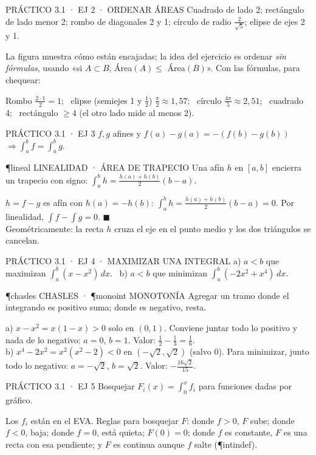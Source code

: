 \begin{enunciado}{PRÁCTICO 3.1 · EJ 2 · ORDENAR ÁREAS}
Cuadrado de lado 2; rectángulo de lado menor 2; rombo de diagonales 2 y 1; círculo de radio $\frac2{\sqrt5}$; elipse de ejes 2 y 1.
\end{enunciado}
\begin{falta}
La figura muestra cómo están encajadas; la idea del ejercicio es ordenar \emph{sin fórmulas}, usando «si $A\subset B$, Área$(A)\le$ Área$(B)$». Con las fórmulas, para chequear:
\end{falta}
Rombo $\frac{2\cdot1}2=1$; \ elipse (semiejes 1 y $\frac12$) $\frac\pi2\approx1{,}57$; \ círculo $\frac{4\pi}5\approx2{,}51$; \ cuadrado 4; \ rectángulo $\ge4$ (el otro lado mide al menos 2).

\begin{enunciado}{PRÁCTICO 3.1 · EJ 3}
$f,g$ afines y $f(a)-g(a)=-(f(b)-g(b))$ $\Rightarrow\int_a^bf=\int_a^bg$.
\end{enunciado}
\begin{uso}{\P{lineal} LINEALIDAD · ÁREA DE TRAPECIO}
Una afín $h$ en $[a,b]$ encierra un trapecio con signo: $\int_a^bh=\frac{h(a)+h(b)}2(b-a)$.
\end{uso}
$h=f-g$ es afín con $h(a)=-h(b)$: $\int_a^bh=\frac{h(a)+h(b)}2(b-a)=0$. Por linealidad, $\int f-\int g=0$. $\blacksquare$\\
Geométricamente: la recta $h$ cruza el eje en el punto medio y los dos triángulos se cancelan.

\begin{enunciado}{PRÁCTICO 3.1 · EJ 4 · MAXIMIZAR UNA INTEGRAL}
a) $a<b$ que maximizan $\int_a^b(x-x^2)\,dx$. \ b) $a<b$ que minimizan $\int_a^b(-2x^2+x^4)\,dx$.
\end{enunciado}
\begin{uso}{\P{chasles} CHASLES · \P{monoint} MONOTONÍA}
Agregar un tramo donde el integrando es positivo suma; donde es negativo, resta.
\end{uso}
a) $x-x^2=x(1-x)>0$ solo en $(0,1)$. Conviene juntar todo lo positivo y nada de lo negativo: $a=0$, $b=1$. Valor: $\frac12-\frac13=\frac16$.\\
b) $x^4-2x^2=x^2(x^2-2)<0$ en $(-\sqrt2,\sqrt2)$ (salvo 0). Para minimizar, junto todo lo negativo: $a=-\sqrt2$, $b=\sqrt2$. Valor: $-\frac{16\sqrt2}{15}$.

\begin{enunciado}{PRÁCTICO 3.1 · EJ 5}
Bosquejar $F_i(x)=\int_0^xf_i$ para funciones dadas por gráfico.
\end{enunciado}
\begin{falta}
Los $f_i$ están en el EVA. Reglas para bosquejar $F$: donde $f>0$, $F$ sube; donde $f<0$, baja; donde $f=0$, está quieta; $F(0)=0$; donde $f$ es constante, $F$ es una recta con esa pendiente; y $F$ es continua aunque $f$ salte (\P{intindef}).
\end{falta}


